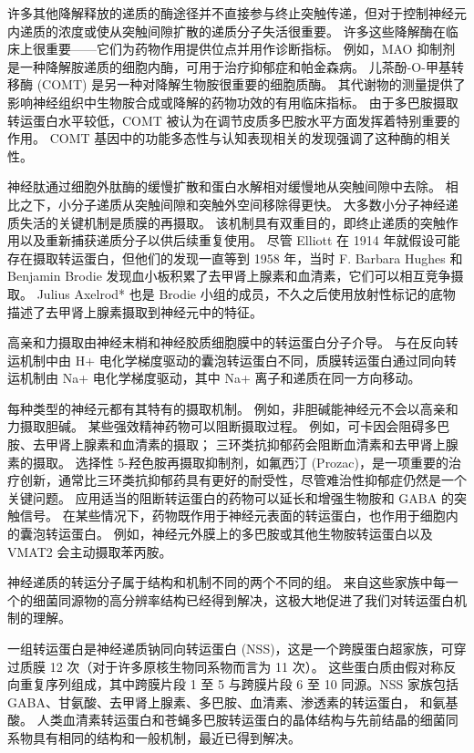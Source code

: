 许多其他降解释放的递质的酶途径并不直接参与终止突触传递，但对于控制神经元内递质的浓度或使从突触间隙扩散的递质分子失活很重要。 许多这些降解酶在临床上很重要——它们为药物作用提供位点并用作诊断指标。 例如，MAO 抑制剂是一种降解胺递质的细胞内酶，可用于治疗抑郁症和帕金森病。 儿茶酚-O-甲基转移酶 (COMT) 是另一种对降解生物胺很重要的细胞质酶。 其代谢物的测量提供了影响神经组织中生物胺合成或降解的药物功效的有用临床指标。 由于多巴胺摄取转运蛋白水平较低，COMT 被认为在调节皮质多巴胺水平方面发挥着特别重要的作用。 COMT 基因中的功能多态性与认知表现相关的发现强调了这种酶的相关性。

神经肽通过细胞外肽酶的缓慢扩散和蛋白水解相对缓慢地从突触间隙中去除。 相比之下，小分子递质从突触间隙和突触外空间移除得更快。 大多数小分子神经递质失活的关键机制是质膜的再摄取。 该机制具有双重目的，即终止递质的突触作用以及重新捕获递质分子以供后续重复使用。 尽管 Elliott 在 1914 年就假设可能存在摄取转运蛋白，但他们的发现一直等到 1958 年，当时 F. Barbara Hughes 和 Benjamin Brodie 发现血小板积累了去甲肾上腺素和血清素，它们可以相互竞争摄取。 Julius Axelrod* 也是 Brodie 小组的成员，不久之后使用放射性标记的底物描述了去甲肾上腺素摄取到神经元中的特征。

高亲和力摄取由神经末梢和神经胶质细胞膜中的转运蛋白分子介导。 与在反向转运机制中由 H+ 电化学梯度驱动的囊泡转运蛋白不同，质膜转运蛋白通过同向转运机制由 Na+ 电化学梯度驱动，其中 Na+ 离子和递质在同一方向移动。

每种类型的神经元都有其特有的摄取机制。 例如，非胆碱能神经元不会以高亲和力摄取胆碱。 某些强效精神药物可以阻断摄取过程。 例如，可卡因会阻碍多巴胺、去甲肾上腺素和血清素的摄取； 三环类抗抑郁药会阻断血清素和去甲肾上腺素的摄取。 选择性 5-羟色胺再摄取抑制剂，如氟西汀 (Prozac)，是一项重要的治疗创新，通常比三环类抗抑郁药具有更好的耐受性，尽管难治性抑郁症仍然是一个关键问题。 应用适当的阻断转运蛋白的药物可以延长和增强生物胺和 GABA 的突触信号。 在某些情况下，药物既作用于神经元表面的转运蛋白，也作用于细胞内的囊泡转运蛋白。 例如，神经元外膜上的多巴胺或其他生物胺转运蛋白以及 VMAT2 会主动摄取苯丙胺。

神经递质的转运分子属于结构和机制不同的两个不同的组。 来自这些家族中每一个的细菌同源物的高分辨率结构已经得到解决，这极大地促进了我们对转运蛋白机制的理解。

一组转运蛋白是神经递质钠同向转运蛋白 (NSS)，这是一个跨膜蛋白超家族，可穿过质膜 12 次（对于许多原核生物同系物而言为 11 次）。 这些蛋白质由假对称反向重复序列组成，其中跨膜片段 1 至 5 与跨膜片段 6 至 10 同源。NSS 家族包括 GABA、甘氨酸、去甲肾上腺素、多巴胺、血清素、渗透素的转运蛋白， 和氨基酸。 人类血清素转运蛋白和苍蝇多巴胺转运蛋白的晶体结构与先前结晶的细菌同系物具有相同的结构和一般机制，最近已得到解决。

